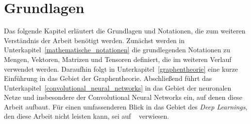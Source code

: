 \chapter{Grundlagen}
\label{grundlagen}

Das folgende Kapitel erläutert die Grundlagen und Notationen, die zum weiteren Verständnis der Arbeit benötigt werden.
Zunächst werden in Unterkapitel~\ref{mathematische_notationen} die grundlegenden Notationen zu Mengen, Vektoren, Matrizen und Tensoren definiert, die im weiteren Verlauf verwendet werden.
Daraufhin folgt in Unterkapitel~\ref{graphentheorie} eine kurze Einführung in das Gebiet der Graphentheorie.
Abschließend führt das Unterkapitel~\ref{convolutional_neural_networks} in das Gebiet der neuronalen Netze und insbesondere der Convolutional Neural Networks ein, auf denen diese Arbeit aufbaut.
Für einen umfassenderen Blick in das Gebiet des \emph{Deep Learnings}, den diese Arbeit nicht leisten kann, sei auf \citeauthor{Nielsen}~\cite{Nielsen} verwiesen.




